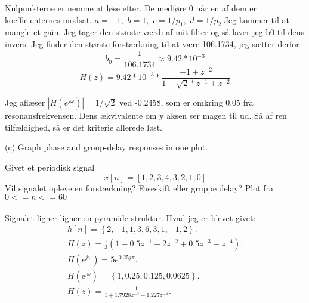 \begin{Opgaver}
\begin{kapitel}
\begin{Opgave}
\begin{UnderOpgave}
                Nulpunkterne er nemme at løse efter. De medføre 0 når en af dem er koefficienternes modsat. 
                $a = -1, $ 
                $b = 1, $
                $c = 1/p_1, $
                $d = 1/p_2$
                Jeg kommer til at mangle et gain. Jeg tager den største værdi af mit filter og så laver jeg b0 til dens invers. 
                Jeg finder den største forstærkning til at være 106.1734, jeg sætter derfor 
                \[b_0 = \frac{1}{106.1734} \approx 9.42*10^{-3}\]
                \[H(z) = 9.42*10^{-3} * \frac{-1 + z^{-2}}{1 - \sqrt{2}*z^{-1} + z^{-2}}\]
            \end{UnderOpgave}
            \begin{UnderOpgave}

                Jeg aflæser $|H(e^{j\omega})| = 1/\sqrt{2}$ ved -0.2458, som er omkring 0.05 fra resonansfrekvensen. Dens ækvivalente om y aksen ser magen til ud.
                Så af ren tilfældighed, så er det kriterie allerede løst.
                
            \end{UnderOpgave}


            (c) Graph phase and group-delay responses in one plot.\\


        
        \end{Opgave}
        \begin{Opgave}
            Givet et periodisk signal 
            \[x[n] = [1, 2, 3, 4, 3, 2, 1, 0]\]
            Vil signalet opleve en forstærkning? Faseskift eller gruppe delay? 
            Plot fra $0 <= n <= 60$\\\\
            Signalet ligner ligner en pyramide struktur. 
            Hvad jeg er blevet givet:
            \[\begin{array}{l}
                {{h[n]=\left\{2,-1,1,3,6,3,1,-1,2\right\}.}}\\ 
                {{H(z)=\frac{1}{3}(1-0.5z^{-1}+2z^{-2}+0.5z^{-3}-z^{-4}).}}\\ 
                {{H(e^{j\omega}) = 5e^{0.25j\pi}.}}\\
                {{H(\mathrm{e}^{\mathrm{j}\omega})=\left\{1,0.25,0.125,0.0625\right\}.}}\\ 
                {{H(z)=\frac{1}{1+1.7928z^{-2}+1.227z^{-4}}.}}\end{array}\]\\\\


\end{Opgave}
\end{kapitel}
\end{Opgaver}
